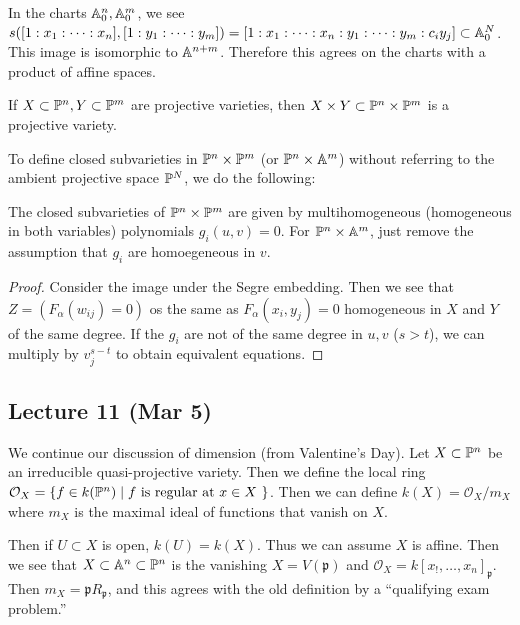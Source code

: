 \documentclass[twoside, 10pt]{article}
\begin{document}
    \begin{rmk} In the charts $\A^n_0, \A^m_0$, we see
        $s([1:x_1:\cdots:x_n],[1:y_1:\cdots:y_m]) =
        [1:x_1:\cdots:x_n:y_1:\cdots:y_m:c_iy_j] \subset \A_0^N$. This image is
        isomorphic to $\A^{n+m}$. Therefore this agrees on the charts with a
    product of affine spaces.  \end{rmk}

    If $X \subset \P^n, Y \subset \P^m$ are projective varieties, then $X
    \times Y \subset \P^n \times \P^m$ is a projective variety.

    To define closed subvarieties in $\P^n \times \P^m$ (or $\P^n \times \A^m$)
    without referring to the ambient projective space $\P^N$, we do the
    following:

    \begin{thm} The closed subvarieties of $\P^n \times \P^m$ are given by
        multihomogeneous (homogeneous in both variables) polynomials $g_i(u,v)
        = 0$. For $\P^n \times \A^m$, just remove the assumption that $g_i$ are
        homoegeneous in $v$.  \begin{proof} Consider the image under the Segre
            embedding. Then we see that $Z = (F_{\alpha}(w_{ij}) = 0)$ os the
            same as $F_{\alpha}(x_i,y_j) = 0$ homogeneous in $X$ and $Y$ of the
            same degree. If the $g_i$ are not of the same degree in $u,v$
        ($s>t$), we can multiply by $v_j^{s-t}$ to obtain equivalent equations.
    \end{proof} \end{thm}

    \subsection{Lecture 11 (Mar 5)} We continue our discussion of dimension
    (from Valentine's Day). Let $X \subset \P^n$ be an irreducible
    quasi-projective variety. Then we define the local ring $\mathcal{O}_X =
    \{f \in k(\P^n) \mid f \text{ is regular at $x \in X$ }\}$. Then we can
    define $k(X) = \mathcal{O}_X/m_X$ where $m_X$ is the maximal ideal of
    functions that vanish on $X$.

    Then if $U \subset X$ is open, $k(U) = k(X)$. Thus we can assume $X$ is
    affine. Then we see that $X \subset \A^n \subset \P^n$ is the vanishing $X
    = V(\mathfrak{p})$ and $\mathcal{O}_X = k[x_!, \ldots,
    x_n]_{\mathfrak{p}}$. Then $m_X = \mathfrak{p}R_{\mathfrak{p}}$, and this
    agrees with the old definition by a ``qualifying exam problem.''
\end{document}

